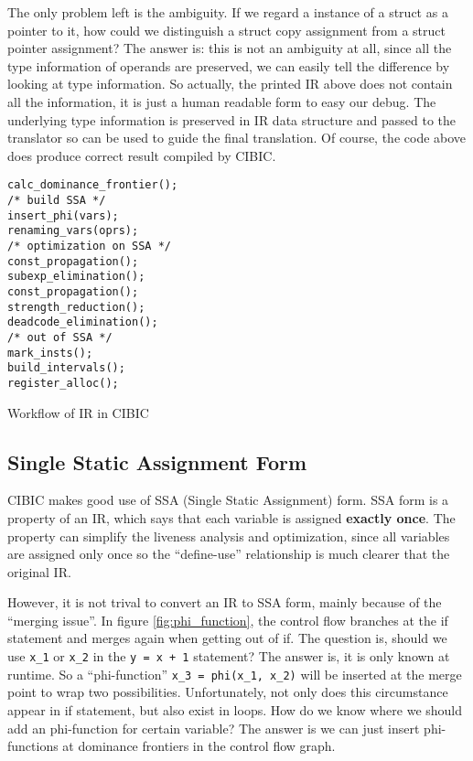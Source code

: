 \documentclass[10pt, a4paper]{article}
\begin{document}
\begin{enumerate}
    The only problem left is the ambiguity. If we regard a instance of a struct
    as a pointer to it, how could we distinguish a struct copy assignment from
    a struct pointer assignment? The answer is: this is not an ambiguity at
    all, since all the type information of operands are preserved, we can
    easily tell the difference by looking at type information. So actually, the
    printed IR above does not contain all the information, it is just a human
    readable form to easy our debug. The underlying type information is
    preserved in IR data structure and passed to the translator so can be used
    to guide the final translation. Of course, the code above does produce
    correct result compiled by CIBIC.
\end{enumerate}

\begin{listing}[H]
    \centering
    \begin{verbatim}
calc_dominance_frontier();
/* build SSA */
insert_phi(vars);
renaming_vars(oprs);
/* optimization on SSA */
const_propagation();
subexp_elimination();
const_propagation();
strength_reduction();
deadcode_elimination();
/* out of SSA */
mark_insts();
build_intervals();
register_alloc();
    \end{verbatim}
    \caption{Workflow of IR in CIBIC}
\end{listing}

\subsection{Single Static Assignment Form}
CIBIC makes good use of SSA (Single Static Assignment) form. SSA form is a
property of an IR, which says that each variable is assigned \textbf{exactly
once}. The property can simplify the liveness analysis and optimization, since
all variables are assigned only once so the ``define-use'' relationship is much
clearer that the original IR.

However, it is not trival to convert an IR to SSA form, mainly because of the
``merging issue''. In figure \ref{fig:phi_function}, the control flow branches
at the if statement and merges again when getting out of if. The question is,
should we use \texttt{x\_1} or \texttt{x\_2} in the \texttt{y = x + 1}
statement? The answer is, it is only known at runtime. So a ``phi-function''
\texttt{x\_3 = phi(x\_1, x\_2)} will be inserted at the merge point to wrap two
possibilities.  Unfortunately, not only does this circumstance appear in if
statement, but also exist in loops. How do we know where we should add an
phi-function for certain variable? The answer is we can just insert
phi-functions at dominance frontiers in the control flow graph.
\end{document}
